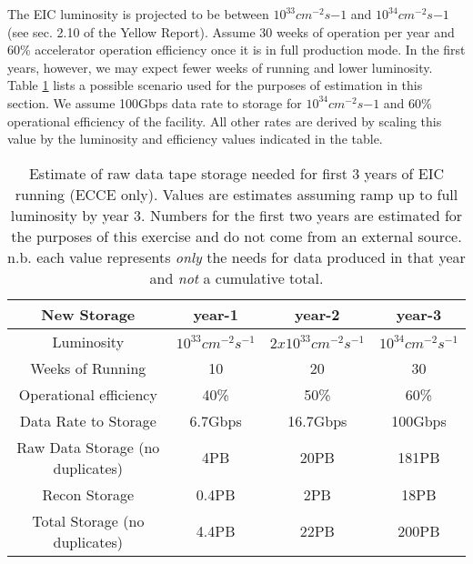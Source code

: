 


The EIC luminosity is projected to be between $10^{33}cm^{-2}s{-1}$ and $10^{34}cm^{-2}s{-1}$ (see sec. 2.10 of the Yellow Report\cite{eic_yellow_report_v1_1}). Assume 30 weeks of operation per year and 60\% accelerator operation efficiency once it is in full production mode. In the first years, however, we may expect fewer weeks of running and lower luminosity. Table \ref{tab:integrated_luminosity_by_year} lists a possible scenario used for the purposes of estimation in this section. We assume 100Gbps data rate to storage for $10^{34}cm^{-2}s{-1}$ and 60\% operational efficiency of the facility. All other rates are derived by scaling this value by the luminosity and efficiency values indicated in the table.


\begin{table}[htb!]
    \centering
    \begin{tabular}{c|c|c|c}
        \hline
        \hline
         \textbf{New Storage}       & year-1                & year-2                  & year-3                \\
        \hline
         Luminosity              & $10^{33}cm^{-2}s^{-1}$ & $2x10^{33}cm^{-2}s^{-1}$ & $10^{34}cm^{-2}s^{-1}$ \\
         \hline
         Weeks of Running        & 10                    & 20                      & 30                    \\
         \hline
         Operational efficiency    & 40\%                  & 50\%                    & 60\%                  \\
         \hline
         Data Rate to Storage    & 6.7Gbps               & 16.7Gbps                & 100Gbps               \\
         \hline
         Raw Data Storage (no duplicates) & 4PB          & 20PB                    & 181PB                 \\
         \hline
         Recon Storage          & 0.4PB                  & 2PB                    & 18PB                   \\
         \hline
         Total Storage (no duplicates) & 4.4PB           & 22PB                   & 200PB                  \\
         \hline
   \end{tabular}
    \caption{Estimate of raw data tape storage needed for first 3 years of EIC running (ECCE only). Values are estimates assuming ramp up to full luminosity  by year 3. Numbers for the first two years are estimated for the purposes of this exercise and do not come from an external source. n.b. each value represents \emph{only} the needs for data produced in that year and \emph{not} a cumulative total.}
    \label{tab:integrated_luminosity_by_year}
\end{table}

